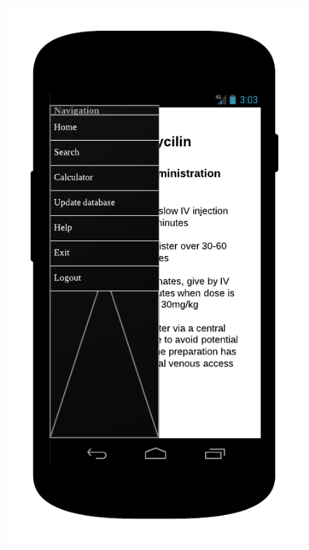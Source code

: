 \begin{figure}
\begin{minipage}{.5\textwidth}
  \includegraphics[width=.7\linewidth]{Images/mockups/menu.png}
\end{minipage}
\end{figure}

